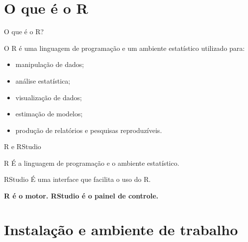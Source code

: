 \documentclass[11pt]{beamer}
\begin{document}
	\section{O que é o R}
	
	\begin{frame}{O que é o R?}
		
		O R é uma linguagem de programação e um ambiente estatístico utilizado para:
		
		\begin{itemize}
			\item manipulação de dados;
			\item análise estatística;
			\item visualização de dados;
			\item estimação de modelos;
			\item produção de relatórios e pesquisas reproduzíveis.
		\end{itemize}
		
	\end{frame}
	
	\begin{frame}{R e RStudio}
		
		\begin{block}{R}
			É a linguagem de programação e o ambiente estatístico.
		\end{block}
		
		\begin{block}{RStudio}
			É uma interface que facilita o uso do R.
		\end{block}
		
		\vspace{0.3cm}
		
		\begin{center}
			\textbf{R é o motor. RStudio é o painel de controle.}
		\end{center}
		
	\end{frame}
	
	\section{Instalação e ambiente de trabalho}
	
\end{document}
